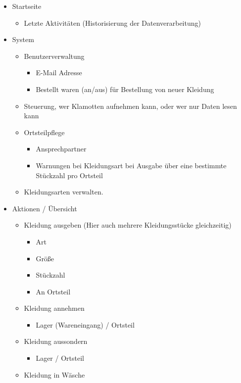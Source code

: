 \begin{itemize}
\item Startseite
  \begin{itemize}
  \item Letzte Aktivitäten (Historisierung der Datenverarbeitung)
  \end{itemize}
\item System
  \begin{itemize}
  \item Benutzerverwaltung
    \begin{itemize}
    \item E-Mail Adresse
    \item Bestellt waren (an/aus) für Bestellung von neuer Kleidung
    \end{itemize}
  \item Steuerung, wer Klamotten aufnehmen kann, oder wer nur Daten lesen kann
  \item Ortsteilpflege 
    \begin{itemize}
    \item Ansprechpartner
    \item Warnungen bei Kleidungsart bei Ausgabe über eine bestimmte Stückzahl pro Ortsteil
    \end{itemize}
  \item Kleidungsarten verwalten.
  \end{itemize}
\item Aktionen / Übersicht
  \begin{itemize}
  \item Kleidung ausgeben (Hier auch mehrere Kleidungsstücke gleichzeitig)
    \begin{itemize}
    \item Art
    \item Größe
    \item Stückzahl
    \item An Ortsteil
    \end{itemize}
  \item Kleidung annehmen
    \begin{itemize}
    \item Lager (Wareneingang) / Ortsteil
    \end{itemize}
  \item Kleidung aussondern
    \begin{itemize}
    \item Lager / Ortsteil
    \end{itemize}
  \item Kleidung in Wäsche

\end{itemize}
\end{itemize}
